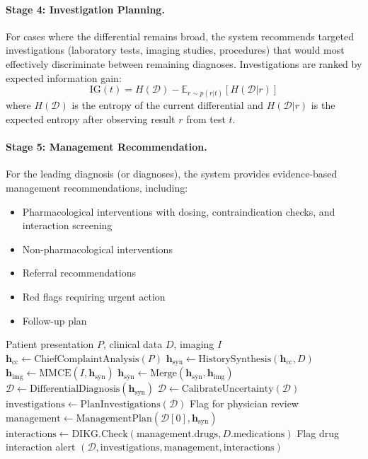 \documentclass[11pt,a4paper]{article}
\begin{document}
\paragraph{Stage 4: Investigation Planning.} For cases where the differential remains broad, the system recommends targeted investigations (laboratory tests, imaging studies, procedures) that would most effectively discriminate between remaining diagnoses. Investigations are ranked by expected information gain:
\begin{equation}
    \text{IG}(t) = H(\mathcal{D}) - \mathbb{E}_{r \sim p(r|t)} [H(\mathcal{D} | r)]
\end{equation}
where $H(\mathcal{D})$ is the entropy of the current differential and $H(\mathcal{D} | r)$ is the expected entropy after observing result $r$ from test $t$.

\paragraph{Stage 5: Management Recommendation.} For the leading diagnosis (or diagnoses), the system provides evidence-based management recommendations, including:
\begin{itemize}
    \item Pharmacological interventions with dosing, contraindication checks, and interaction screening
    \item Non-pharmacological interventions
    \item Referral recommendations
    \item Red flags requiring urgent action
    \item Follow-up plan
\end{itemize}

\begin{algorithm}[t]
\caption{Clinical Reasoning Chain}
\label{alg:crc}
\begin{algorithmic}[1]
\Require Patient presentation $P$, clinical data $D$, imaging $I$
\State $\bm{h}_{\text{cc}} \leftarrow \text{ChiefComplaintAnalysis}(P)$
\State $\bm{h}_{\text{syn}} \leftarrow \text{HistorySynthesis}(\bm{h}_{\text{cc}}, D)$
    \State $\bm{h}_{\text{img}} \leftarrow \text{MMCE}(I, \bm{h}_{\text{syn}})$
    \State $\bm{h}_{\text{syn}} \leftarrow \text{Merge}(\bm{h}_{\text{syn}}, \bm{h}_{\text{img}})$
\EndIf
\State $\mathcal{D} \leftarrow \text{DifferentialDiagnosis}(\bm{h}_{\text{syn}})$
\State $\mathcal{D} \leftarrow \text{CalibrateUncertainty}(\mathcal{D})$
    \State $\text{investigations} \leftarrow \text{PlanInvestigations}(\mathcal{D})$
    \State Flag for physician review
\EndIf
\State $\text{management} \leftarrow \text{ManagementPlan}(\mathcal{D}[0], \bm{h}_{\text{syn}})$
\State $\text{interactions} \leftarrow \text{DIKG.Check}(\text{management.drugs}, D.\text{medications})$
    \State Flag drug interaction alert
\EndIf
\State \Return $(\mathcal{D}, \text{investigations}, \text{management}, \text{interactions})$
\end{algorithmic}
\end{algorithm}
\end{document}
